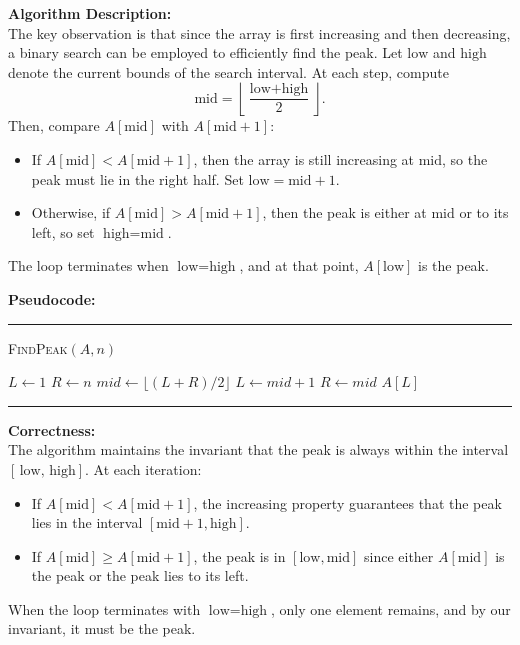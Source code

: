 \documentclass[11pt]{article}
\begin{document}
    \textbf{Algorithm Description:} \\
    The key observation is that since the array is first increasing and then decreasing, a binary search can be employed to efficiently find the peak. Let \( \text{low} \) and \( \text{high} \) denote the current bounds of the search interval. At each step, compute
    \[
    \text{mid} = \left\lfloor \frac{\text{low} + \text{high}}{2} \right\rfloor.
    \]
    Then, compare \( A[\text{mid}] \) with \( A[\text{mid}+1] \):
    \begin{itemize}
        \item If \( A[\text{mid}] < A[\text{mid}+1] \), then the array is still increasing at \( \text{mid} \), so the peak must lie in the right half. Set \( \text{low} = \text{mid} + 1 \).
        \item Otherwise, if \( A[\text{mid}] > A[\text{mid}+1] \), then the peak is either at \( \text{mid} \) or to its left, so set \( \text{high} = \text{mid} \).
    \end{itemize}
    The loop terminates when \( \text{low} = \text{high} \), and at that point, \( A[\text{low}] \) is the peak.
    
    \bigskip
    
    \textbf{Pseudocode:}

    \par\noindent\rule{\textwidth}{0.4pt}
    \smallskip        
    \textsc{FindPeak}$(A, n)$
    \begin{algorithmic}[1]
        \STATE $L \gets 1$
        \STATE $R \gets n$
            \STATE $mid \gets \lfloor (L+R)/2 \rfloor$
                \STATE $L \gets mid+1$
            \ELSE
                \STATE $R \gets mid$
            \ENDIF
        \ENDWHILE
        \RETURN $A[L]$
    \end{algorithmic}
    \vspace{-2mm}
    \par\noindent\rule{\textwidth}{0.4pt}
    
    \bigskip
    
    \textbf{Correctness:} \\
    The algorithm maintains the invariant that the peak is always within the interval \([\,\text{low},\, \text{high}]\). At each iteration:
    \begin{itemize}
        \item If \( A[\text{mid}] < A[\text{mid}+1] \), the increasing property guarantees that the peak lies in the interval \([\text{mid}+1, \text{high}]\).
        \item If \( A[\text{mid}] \geq A[\text{mid}+1] \), the peak is in \([\text{low}, \text{mid}]\) since either \( A[\text{mid}] \) is the peak or the peak lies to its left.
    \end{itemize}
    When the loop terminates with \( \text{low} = \text{high} \), only one element remains, and by our invariant, it must be the peak.
    
\end{document}
